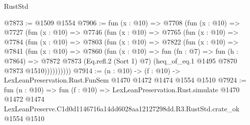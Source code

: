 \begin{lexlean}{RustStd}
\begin{coremodule}
@7873 := @1509 @1554
@7906 := fun (x : @10) =>
  @7708
    (fun (x : @10) =>
    @7727
      (fun (x : @10) =>
      @7746
        (fun (x : @10) =>
        @7765
          (fun (x : @10) =>
          @7784
            (fun (x : @10) =>
            @7803
              (fun (x : @10) =>
              @7822
                (fun (x : @10) =>
                @7841
                  (fun (x : @10) =>
                  @7860
                    (fun (x : @10) =>
                    fun (fn : @7) =>
                    fun (h : @7864) =>
                    @7872
                      @7873
                      (Eq.refl.{2} (Sort 1) @7)
                      (heq_of_eq.{1} @1495 @7870 @7873 @1510))))))))))
@7914 := (n : @10) -> (f : @10) -> LexLeanPreservation.Rust.FunSem @1470 @1472 @1474 @1554 @1510
@7924 := fun (n : @10) =>
  fun (f : @10) =>
  LexLeanPreservation.Rust.simulate
    @1470
    @1472
    @1474
    LexLeanPreserve.C1d0d1146716a14dd6028aa12127298dd.R3.RustStd.crate_ok
    @1554
    @1510
\end{coremodule}
\end{lexlean}
